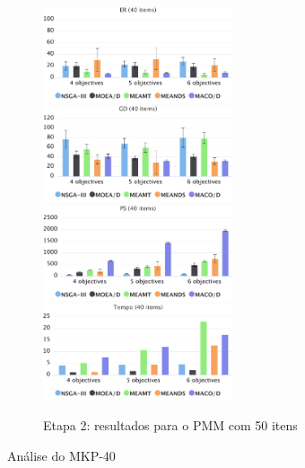 \begin{figure}[!htbp]
	\caption{Etapa 2: resultados para o PMM com 50 itens}
	\label{fig_exp2_mkp_50}
	\includegraphics[width=0.5\textwidth]{cap_experimentos/figs/etapa2/er-mkp-40}
	\includegraphics[width=0.5\textwidth]{cap_experimentos/figs/etapa2/gd-mkp-40}
	\includegraphics[width=0.5\textwidth]{cap_experimentos/figs/etapa2/ps-mkp-40}
	\includegraphics[width=0.5\textwidth]{cap_experimentos/figs/etapa2/time-mkp-40}
\end{figure}

Análise do MKP-40

